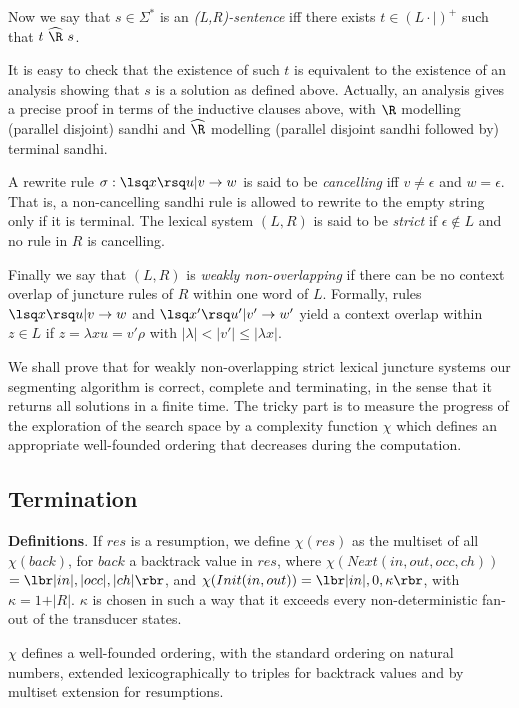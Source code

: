Now we say that $s\in\Sigma^*$ is an {\sl (L,R)-sentence} iff there exists 
$t\in(L\cdot |)^{+}$ such that $t ~{\widehat{\R}}~ s$.

It is easy to check that the existence of such
$t$ is equivalent to the existence
of an analysis showing that $s$ is a solution as defined above. Actually,
an analysis gives a precise proof in terms of the inductive clauses above,
with $\R$ modelling (parallel disjoint) sandhi and $\widehat{\R}$ modelling 
(parallel disjoint sandhi followed by) terminal sandhi.

A rewrite rule $\sigma:\lsq x\rsq u|v\rightarrow w$ is said to be
{\sl cancelling} iff $v\neq\epsilon$ and $w=\epsilon$. That is, a 
non-cancelling sandhi rule is allowed to rewrite to the empty string only
if it is terminal. The lexical system $(L,R)$ is said
to be {\sl strict} if $\epsilon\notin L$ and no rule in $R$ is cancelling.

Finally we say that $(L,R)$ is {\sl weakly non-overlapping} if there can be
no context overlap of juncture rules of $R$ within one word of $L$. Formally,
rules $\lsq x\rsq u|v\rightarrow w$ and $\lsq x'\rsq u'|v'\rightarrow w'$
yield a context overlap within $z\in L$ if $z=\lambda x u = v'\rho$ with
$\vert\lambda\vert<\vert v'\vert\leq \vert\lambda x\vert$.

We shall prove that for weakly non-overlapping strict lexical juncture
systems our segmenting algorithm is correct, complete and
terminating, in the sense that it returns all solutions in a finite time.
The tricky part is to measure the progress of the exploration of the search
space by a complexity function $\chi$ which defines an
appropriate well-founded ordering that decreases during the computation.

\subsection{Termination}

\noindent
{\bf Definitions}. If $res$ is a resumption, we define $\chi(res)$
as the multiset of all $\chi(back)$, for $back$ a backtrack value in $res$,
where $\chi(Next(in,out,occ,ch))$
$=\lbr\vert in\vert,\vert occ\vert,\vert ch\vert\rbr$,
and $\chi(Init(in,out))=\lbr\vert in\vert,0,\kappa\rbr$, 
with $\kappa=1+\vert R\vert$. $\kappa$ is chosen
in such a way that it exceeds every non-deterministic fan-out of the
transducer states. 

$\chi$ defines a well-founded ordering, with the standard ordering on natural
numbers, extended lexicographically to triples for backtrack values 
and by multiset extension \cite{dershowitz} for resumptions.

